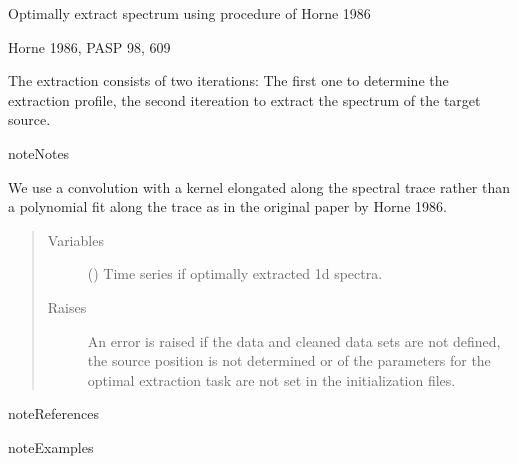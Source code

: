 \documentclass[a4paper,10pt,english]{sphinxmanual}
\begin{document}
\begin{fulllineitems}
\begin{fulllineitems}
\begin{quote}
\begin{description}
\end{description}\end{quote}

\end{fulllineitems}


\begin{fulllineitems}
\label{\detokenize{cascade.TSO:cascade.TSO.TSO.TSOSuite.optimal_extraction}}
Optimally extract spectrum using procedure of Horne 1986
%
\begin{footnote}[1]\sphinxAtStartFootnote
Horne 1986, PASP 98, 609
%
\end{footnote} The extraction consists of two iterations: The first one to
determine the extraction profile, the second itereation to
extract the spectrum of the target source.

\begin{sphinxadmonition}{note}{Notes}

We use a convolution with a kernel elongated along the spectral trace
rather than a polynomial fit along the trace as in the original paper
by Horne 1986.
\end{sphinxadmonition}
\begin{quote}\begin{description}
\item[{Variables}] \leavevmode
{} () \textendash{} Time series if optimally extracted 1d spectra.

\item[{Raises}] \leavevmode
{} \textendash{} An error is raised if the data and cleaned data sets are not
defined, the source position is not determined or of the
parameters for the optimal extraction task are not set in the
initialization files.

\end{description}\end{quote}

\begin{sphinxadmonition}{note}{References}
\end{sphinxadmonition}

\begin{sphinxadmonition}{note}{Examples}


\end{sphinxadmonition}
\end{fulllineitems}
\end{fulllineitems}
\end{document}
